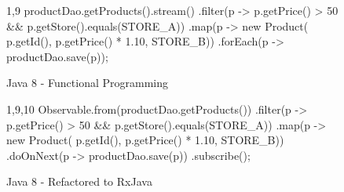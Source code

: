 \begin{figure}[H]
\begin{minipage}{0.48\textwidth}
\begin{sourcecode}
\begin{javacode}{1,9}
productDao.getProducts().stream()
        .filter(p ->
                p.getPrice() > 50 &&
                p.getStore().equals(STORE_A))
        .map(p -> new Product(
                p.getId(),
                p.getPrice() * 1.10,
                STORE_B))
        .forEach(p -> productDao.save(p));
\end{javacode}
\caption{Java 8 - Functional Programming}
\label{code:con-java8}
\end{sourcecode}
\end{minipage}\hspace{0.7cm}
\begin{minipage}{0.48\textwidth}
\begin{sourcecode}
\begin{javacode}{1,9,10}
Observable.from(productDao.getProducts())
        .filter(p ->
                p.getPrice() > 50 &&
                p.getStore().equals(STORE_A))
        .map(p -> new Product(
                p.getId(),
                p.getPrice() * 1.10,
                STORE_B))
        .doOnNext(p -> productDao.save(p))
        .subscribe();
\end{javacode}
\caption{Java 8 - Refactored to RxJava}
\label{code:con-rxjava}
\end{sourcecode}
\end{minipage}
\end{figure}